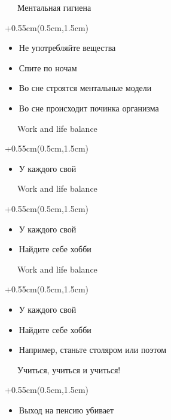 \documentclass[xetex,18pt,aspectratio=169]{beamer}
\begin{document}
\begin{Large}
\begin{frame}{\ \ \ Ментальная гигиена}
\begin{textblock*}{\framewidth+0.55cm}(0.5cm,1.5cm)
\begin{itemize}
  \item Не употребляйте вещества
  \item Спите по ночам
  \item Во сне строятся ментальные модели
  \item Во сне происходит починка организма
\end{itemize}
\end{textblock*}
\end{frame}

\begin{frame}{\ \ \ Work and life balance}
\begin{textblock*}{\framewidth+0.55cm}(0.5cm,1.5cm)
\begin{itemize}
  \item У каждого свой
\end{itemize}
\end{textblock*}
\end{frame}

\begin{frame}{\ \ \ Work and life balance}
\begin{textblock*}{\framewidth+0.55cm}(0.5cm,1.5cm)
\begin{itemize}
  \item У каждого свой
  \item Найдите себе хобби
\end{itemize}
\end{textblock*}
\end{frame}

\begin{frame}{\ \ \ Work and life balance}
\begin{textblock*}{\framewidth+0.55cm}(0.5cm,1.5cm)
\begin{itemize}
  \item У каждого свой
  \item Найдите себе хобби
  \item Например, станьте столяром или поэтом
\end{itemize}
\end{textblock*}
\end{frame}

\begin{frame}{\ \ \ Учиться, учиться и учиться!}
\begin{textblock*}{\framewidth+0.55cm}(0.5cm,1.5cm)
\begin{itemize}
  \item Выход на пенсию убивает
\end{itemize}
\end{textblock*}
\end{frame}


\end{Large}
\end{document}
